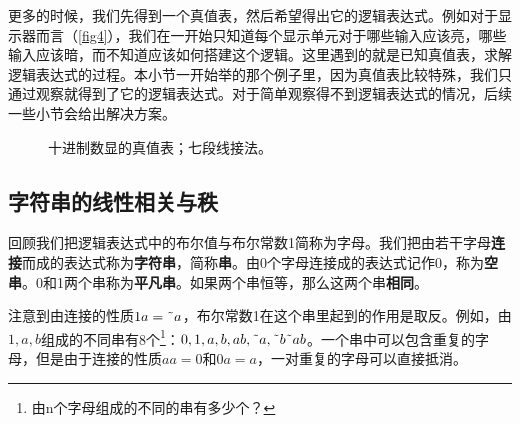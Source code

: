 更多的时候，我们先得到一个真值表，然后希望得出它的逻辑表达式。例如对于显示器而言（\autoref{fig4}），我们在一开始只知道每个显示单元对于哪些输入应该亮，哪些输入应该暗，而不知道应该如何搭建这个逻辑。这里遇到的就是已知真值表，求解逻辑表达式的过程。本小节一开始举的那个例子里，因为真值表比较特殊，我们只通过观察就得到了它的逻辑表达式。对于简单观察得不到逻辑表达式的情况，后续一些小节会给出解决方案。
\begin{figure}[!ht]
  \centering
  \qquad
  \caption{\protect{}十进制数显的真值表；\protect{}七段线接法。}\label{fig4}
\end{figure}

\subsection{字符串的线性相关与秩}
回顾我们把逻辑表达式中的布尔值与布尔常数1简称为字母。我们把由若干字母\textbf{连接}而成的表达式称为\textbf{字符串}，简称\textbf{串}。由0个字母连接成的表达式记作0，称为\textbf{空串}。0和1两个串称为\textbf{平凡串}。如果两个串恒等，那么这两个串\textbf{相同}。

注意到由连接的性质$1a=\textrm{\~{}} a$，布尔常数1在这个串里起到的作用是取反。例如，由$1,a,b$组成的不同串有8个\footnote{由n个字母组成的不同的串有多少个？}：$0,1,a,b,ab,\textrm{\~{}}a,\textrm{\~{}}b\textrm{\~{}}ab$。一个串中可以包含重复的字母，但是由于连接的性质$aa=0$和$0a=a$，一对重复的字母可以直接抵消。

